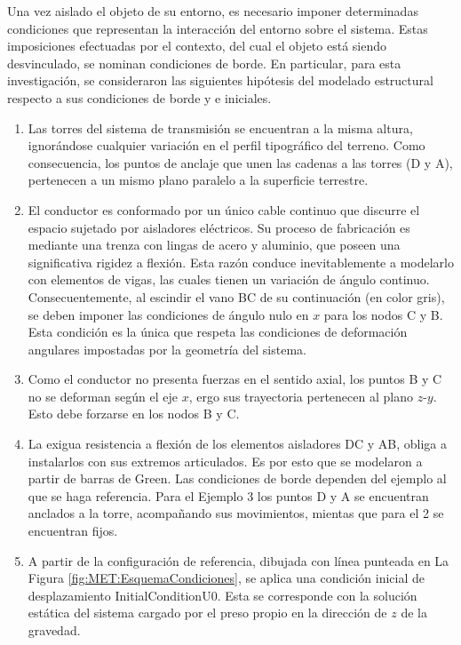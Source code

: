 Una vez aislado el objeto de su entorno, es necesario imponer determinadas condiciones que representan la interacción del entorno sobre el sistema. Estas imposiciones efectuadas por el contexto, del cual el objeto está siendo desvinculado, se nominan condiciones de borde. En particular, para esta investigación, se consideraron las siguientes hipótesis del modelado estructural respecto a sus condiciones de borde y e iniciales.

\begin{enumerate}
	\item Las torres del sistema de transmisión se encuentran a la misma altura, ignorándose cualquier variación en el perfil tipográfico del terreno. Como consecuencia, los puntos de anclaje que unen las cadenas a las torres (D y A), pertenecen a un mismo plano paralelo a la superficie terrestre.
	\item  El conductor es conformado por un único cable continuo que discurre el espacio sujetado por aisladores eléctricos. Su proceso de fabricación es mediante una trenza con lingas de acero y aluminio, que poseen una significativa rigidez a flexión. Esta razón conduce inevitablemente a modelarlo con elementos de vigas, las cuales tienen un variación de ángulo continuo. Consecuentemente, al escindir el vano BC de su continuación (en color gris), se deben imponer las condiciones de ángulo nulo en $x$ para los nodos C y B. Esta condición es la única que respeta las condiciones de deformación angulares impostadas por la geometría del sistema. \item Como el conductor no presenta fuerzas en el sentido axial, los puntos B y C no se deforman según el eje $x$, ergo sus trayectoria pertenecen al plano $z$-$y$. Esto debe forzarse en los nodos B y C. 
	\item La exigua resistencia a flexión de los elementos aisladores DC y AB, obliga a instalarlos con sus extremos articulados. Es por esto que se modelaron a partir de barras de Green. Las condiciones de borde dependen del ejemplo al que se haga referencia. Para el Ejemplo 3 los puntos D y A se encuentran anclados a la torre, acompañando sus movimientos, mientas que para el 2 se encuentran fijos.
	\item A partir de la configuración de referencia, dibujada con línea punteada en La Figura \ref{fig:MET:EsquemaCondiciones}, se aplica una condición inicial de desplazamiento \gls{InitialConditionU0}. Esta se corresponde con la solución estática del sistema cargado por el preso propio en la dirección de $z$ de la gravedad.
\end{enumerate} 


